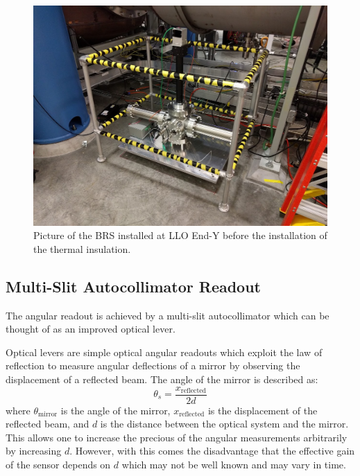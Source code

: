 \documentclass [12pt, proquest]{uwthesis}[2019]
\begin{document}
\begin{figure}[!h]
\begin{center}
 \includegraphics[width=\textwidth]{BRSPic.jpg}
\caption[Picture of an installed BRS]{Picture of the BRS installed at LLO End-Y before the installation of the thermal insulation.}
\label{BRSPic}
\end{center}
\end{figure}

\subsection{Multi-Slit Autocollimator Readout}

The angular readout is achieved by a multi-slit autocollimator \cite{MSA} which can be thought of as an improved optical lever.

Optical levers are simple optical angular readouts which exploit the law of reflection to measure angular deflections of a mirror by observing the displacement of a reflected beam. The angle of the mirror is described as:
\begin{equation}
\theta_{s}=\frac{x_{\text{reflected}}}{2d}
\end{equation}
where $\theta_\text{mirror}$ is the angle of the mirror, $x_\text{reflected}$ is the displacement of the reflected beam, and $d$ is the distance between the optical system and the mirror. This allows one to increase the precious of the angular measurements arbitrarily by increasing $d$. However, with this comes the disadvantage that the effective gain of the sensor depends on $d$ which may not be well known and may vary in time.
\end{document}
